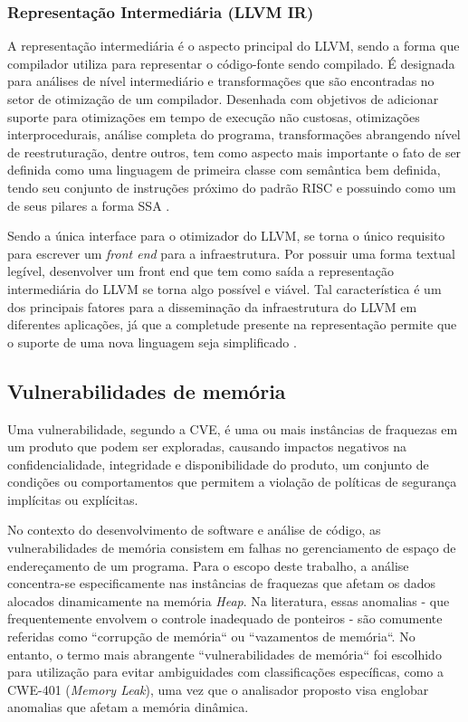 \documentclass[
    12pt,                %
    openright,           %
    oneside,             %
    a4paper,             %
    english,             %
    brazil               %
]{abntex2}
\begin{document}
\subsubsection{Representação Intermediária (LLVM IR)}
\label{subsec:llvm_ir}

A representação intermediária é o aspecto principal do LLVM, sendo a forma que compilador utiliza para representar o código-fonte sendo compilado. É designada para análises de nível intermediário e 
transformações que são encontradas no setor de otimização de um compilador. Desenhada com objetivos de adicionar suporte para otimizações em tempo de execução não custosas, otimizações interprocedurais, 
análise completa do programa, transformações abrangendo nível de reestruturação, dentre outros, tem como aspecto mais importante o fato de ser definida como uma linguagem de primeira classe com semântica bem definida, 
tendo seu conjunto de instruções próximo do padrão RISC e possuindo como um de seus pilares a forma SSA \cite{Lattner2011}.
\par 
Sendo a única interface para o otimizador do LLVM, se torna o único requisito para escrever um \textit{front end} para a infraestrutura. Por possuir uma forma textual legível, desenvolver um front end que tem como saída 
a representação intermediária do LLVM se torna algo possível e viável. Tal característica é um dos principais fatores para a disseminação da infraestrutura do LLVM em diferentes aplicações, 
já que a completude presente na representação permite que o suporte de uma nova linguagem seja simplificado \cite{Lattner2011}.

\subsection{Vulnerabilidades de memória}
\label{subsec:vulnerabilidades_memoria}

Uma vulnerabilidade, segundo a CVE, é uma ou mais instâncias de fraquezas em um produto que podem ser exploradas, causando impactos negativos na confidencialidade, integridade e disponibilidade do produto, 
um conjunto de condições ou comportamentos que permitem a violação de políticas de segurança implícitas ou explícitas.

\par
No contexto do desenvolvimento de software e análise de código, as vulnerabilidades de memória consistem em falhas no gerenciamento de espaço de endereçamento de um programa. Para o escopo deste trabalho, 
a análise concentra-se especificamente nas instâncias de fraquezas que afetam os dados alocados dinamicamente na memória \textit{Heap}. Na literatura, essas anomalias - que frequentemente envolvem o controle inadequado de ponteiros - são comumente 
referidas como ``corrupção de memória`` ou ``vazamentos de memória``. No entanto, o termo mais abrangente ``vulnerabilidades de memória`` foi escolhido para utilização para evitar ambiguidades com classificações específicas, como a CWE-401 (\textit{Memory Leak}), 
uma vez que o analisador proposto visa englobar anomalias que afetam a memória dinâmica.
\end{document}
